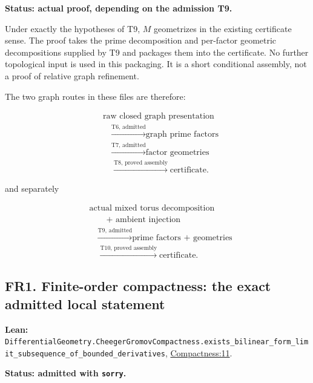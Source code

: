 \documentclass[
  letterpaper,
  11pt]{article}
\begin{document}
\textbf{Status: actual proof, depending on the admission T9.}

Under exactly the hypotheses of T9, \(M\) geometrizes in the existing
certificate sense. The proof takes the prime decomposition and
per-factor geometric decompositions supplied by T9 and packages them
into the certificate. No further topological input is used in this
packaging. It is a short conditional assembly, not a proof of relative
graph refinement.

The two graph routes in these files are therefore:

\[
\begin{aligned}
  &\text{raw closed graph presentation}\\
  &\quad\xrightarrow{\text{T6, admitted}}\text{graph prime factors}\\
  &\quad\xrightarrow{\text{T7, admitted}}\text{factor geometries}\\
  &\quad\xrightarrow{\text{T8, proved assembly}}\text{certificate}.
\end{aligned}
\]

and separately

\[
\begin{aligned}
  &\text{actual mixed torus decomposition}\\
  &\qquad{}+\text{ ambient injection}\\
  &\quad\xrightarrow{\text{T9, admitted}}\text{prime factors + geometries}\\
  &\quad\xrightarrow{\text{T10, proved assembly}}\text{certificate}.
\end{aligned}
\]

\subsection{FR1. Finite-order compactness: the exact admitted local
statement}\label{fr1}

\textbf{Lean:}
{\small\texttt{Differential\allowbreak{}Geometry.\allowbreak{}Cheeger\allowbreak{}Gromov\allowbreak{}Compactness.\allowbreak{}exists\_\allowbreak{}bilinear\_\allowbreak{}form\_\allowbreak{}limit\_\allowbreak{}subsequence\_\allowbreak{}of\_\allowbreak{}bounded\_\allowbreak{}derivatives}},
\href{https://github.com/qinz1yang/differential-geometry-dev/blob/ea0fae60ee01ef8c8d9b57a51794c6538f679c5d/DifferentialGeometry/Analysis/Calculus/Compactness/FiniteOrder.lean\#L11}{Compactness:11}.

\textbf{Status: admitted with {\small\texttt{sorry}}.}
\end{document}
